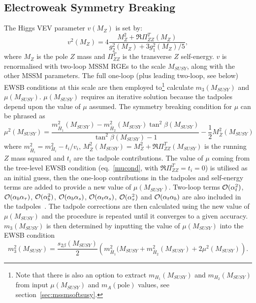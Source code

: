 \documentclass{article}
\def\at{\alpha_t}
\def\ab{\alpha_b}
\def\as{\alpha_s}
\def\atau{\alpha_{\tau}}
\def\oatab{{\cal O}(\at\ab)}
\def\oatas{{\cal O}(\at\as)}
\def\oabas{{\cal O}(\ab\as)}
\def\oatq{{\cal O}(\at^2)}
\def\oabq{{\cal O}(\ab^2)}
\def\oatauq{{\cal O}(\atau^2)}
\def\oabatau{{\cal O}(\ab \atau)}
\begin{document}
\subsection{Electroweak Symmetry Breaking}

The Higgs VEV parameter $v(M_Z)$ is set by:
\begin{equation}
v^2(M_Z) = 4 \frac{M_Z^2 + \Re\Pi_{ZZ}^T(M_Z)}{g_2^2(M_Z) + 3 g_1^2(M_Z) / 5},
\end{equation}
where
$M_Z$ is the pole $Z$ mass and
$\Pi_{ZZ}^T$ is the transverse $Z$ self-energy. $v$ is renormalised with
two-loop MSSM RGEs to the scale $M_{SUSY}$, along with the other MSSM
parameters.  
The full one-loop (plus leading two-loop, see below) EWSB
conditions at this scale are then employed to\footnote{Note that there is also
  an option to extract $m_{H_1}(M_{SUSY})$ and $m_{H_2}(M_{SUSY})$ from input
  $\mu(M_{SUSY})$ and  
$m_A(\mbox{pole})$ values, see section~\protect\ref{sec:mssmsoftsusy}.}
calculate $m_3(M_{SUSY})$ and $\mu(M_{SUSY})$. $\mu(M_{SUSY})$ requires an iterative solution
because the tadpoles depend upon the value of $\mu$ assumed.
The symmetry breaking condition for $\mu$ can be phrased
as~\cite{Pierce:1997zz}
\begin{equation}
\mu^2(M_{SUSY}) =
\frac{m_{\bar{H}_1}^2(M_{SUSY}) -  m_{\bar{H}_2}^2(M_{SUSY}) \tan^2
  \beta(M_{SUSY})}{\tan^2 \beta(M_{SUSY}) - 1} 
- \frac{1}{2} M_{\bar Z}^2(M_{SUSY})
\label{mucond} 
\end{equation}
where $m_{\bar{H}_i}^2 = m_{H_i}^2 - t_i/v_i$, $M_{\bar Z}^2(M_{SUSY}) = M_Z^2 +
\Re\Pi_{ZZ}^T(M_{SUSY})$ is the running $Z$ mass squared and
$t_i$ are the tadpole contributions.
The value of $\mu$ coming from the tree-level EWSB
condition (eq.~\ref{mucond}, with $\Re\Pi_{ZZ}^T=t_i=0$)
is utilised as an initial guess, then the one-loop contributions in the
tadpoles and self-energy terms are added to
provide a new value of $\mu(M_{SUSY})$. Two-loop terms 
$\oatq$, $\oabatau$, $\oabq$, $\oabas$, $\oatas$, $\oatauq$ and
$\oatab$
 are also included
in the 
tadpoles~\cite{Dedes:2002dy,Dedes:2003km}. 
The tadpole corrections are then calculated
using the new value of $\mu(M_{SUSY})$ and the procedure is repeated until it
converges to a given accuracy. $m_3(M_{SUSY})$ is then determined by inputting
the value 
of $\mu(M_{SUSY})$ into the EWSB condition
\begin{equation}
m_3^2(M_{SUSY})=\frac{s_{2\beta}(M_{SUSY})}{2} \left( m_{\bar{H}_1}^2(M_{SUSY} + m_{\bar{H}_2}^2(M_{SUSY}) + 2 \mu^2(M_{SUSY})
\right). \label{Bcond}
\end{equation}
\end{document}
